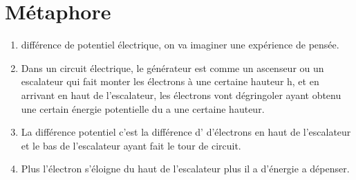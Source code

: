 \documentclass[../main.tex]{subfiles}
\begin{document}
\section{Métaphore}

\begin{enumerate}
    \item différence de potentiel électrique, on va imaginer une expérience de pensée.
    \item Dans un circuit électrique, le générateur est comme un ascenseur ou un escalateur qui fait monter les électrons à une certaine hauteur h, et en arrivant en haut de l'escalateur, les électrons vont dégringoler ayant obtenu une certain énergie potentielle du a une certaine hauteur.
    \item La différence potentiel c'est la différence d' d'électrons en haut de l'escalateur et le bas de l'escalateur ayant fait le tour de circuit.
    \item Plus l'électron s'éloigne du haut de l'escalateur plus il a d'énergie a dépenser.
\end{enumerate}
    
\end{document}
